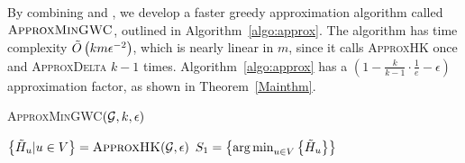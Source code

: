 \documentclass[10pt,twocolumn,twoside]{IEEEtran}
\begin{document}
By combining  and , we develop a faster greedy approximation algorithm called \(\textsc{ApproxMinGWC}\), outlined in Algorithm~\ref{algo:approx}. The algorithm has time  complexity \(\tilde{O}\left( km\epsilon^{-2} \right)\), which  is nearly linear in $m$,  since it calls \textsc{ApproxHK} once and \textsc{ApproxDelta} \(k-1\) times. Algorithm~\ref{algo:approx} has a $(1-\frac{k}{k-1}\cdot\frac{1}{e}-\epsilon)$ approximation factor, as shown in Theorem~\ref{Mainthm}.

\begin{algorithm}
    \caption{\textsc{ApproxMinGWC}\((\mathcal{G},k,\epsilon)\)}
    \label{algo:approx}
    \(\left\{\tilde{H}_u|u\in V  \right\}=\textsc{ApproxHK}(\mathcal{G},\epsilon)\)\;
    \(S_1=\left\{\operatorname*{arg\,min}_{u\in V}\left\{\tilde{H}_u \right\} \right\}\)\;
\end{algorithm}
\end{document}
